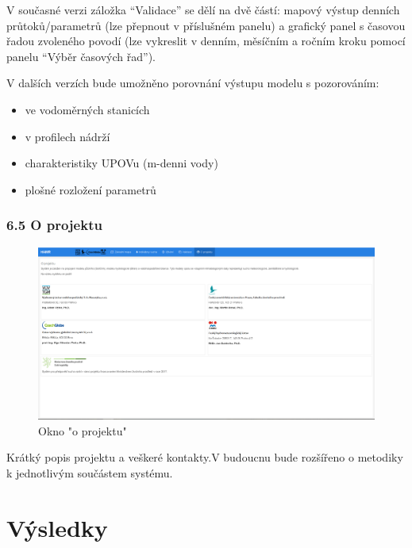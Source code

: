 \documentclass[12pt,]{article}
\providecommand{\tightlist}{%
  \setlength{\itemsep}{0pt}\setlength{\parskip}{0pt}}
\begin{document}
V současné verzi záložka \enquote{Validace} se dělí na dvě částí: mapový
výstup denních průtoků/parametrů (lze přepnout v příslušném panelu) a
grafický panel s časovou řadou zvoleného povodí (lze vykreslit v denním,
měsíčním a ročním kroku pomocí panelu \enquote{Výběr časových řad}).

V dalších verzích bude umožněno porovnání výstupu modelu s pozorováním:

\begin{itemize}
\tightlist
\item
  ve vodoměrných stanicích
\item
  v profilech nádrží
\item
  charakteristiky UPOVu (m-denni vody)
\item
  plošné rozložení parametrů
\end{itemize}

\subsubsection{6.5 O projektu}\label{o-projektu}

\begin{figure}[H]
      \includegraphics[width=\textwidth]{fig/P_o_projektu}
      \caption{Okno "o projektu"}
      \label{fig5}
\end{figure}

Krátký popis projektu a veškeré kontakty.V budoucnu bude rozšířeno o
metodiky k jednotlivým součástem systému.

\newpage

\section*{Výsledky}\label{vysledky}

\newpage
\end{document}
